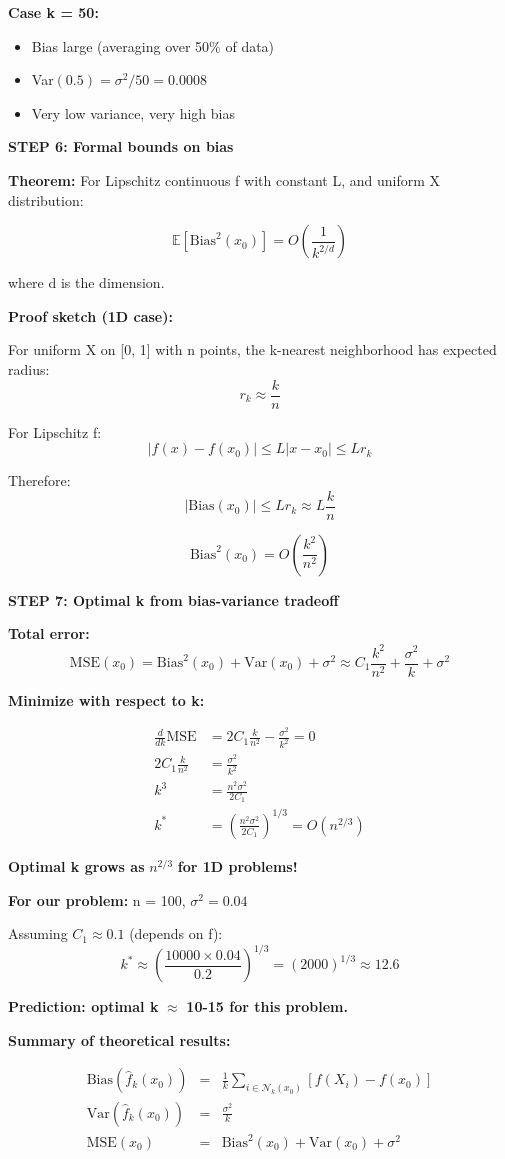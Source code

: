 \documentclass[12pt]{article}
\begin{document}
\begin{solution}
\textbf{Case k = 50:}
\begin{itemize}
    \item Bias large (averaging over 50\% of data)
    \item Var$(0.5) = \sigma^2/50 = 0.0008$
    \item Very low variance, very high bias
\end{itemize}

\textbf{STEP 6: Formal bounds on bias}

\textbf{Theorem:} For Lipschitz continuous f with constant L, and uniform X distribution:

\[
\mathbb{E}[\text{Bias}^2(x_0)] = O\left(\frac{1}{k^{2/d}}\right)
\]

where d is the dimension.

\textbf{Proof sketch (1D case):}

For uniform X on [0, 1] with n points, the k-nearest neighborhood has expected radius:
\[
r_k \approx \frac{k}{n}
\]

For Lipschitz f:
\[
|f(x) - f(x_0)| \leq L|x - x_0| \leq Lr_k
\]

Therefore:
\[
|\text{Bias}(x_0)| \leq Lr_k \approx L\frac{k}{n}
\]

\[
\text{Bias}^2(x_0) = O\left(\frac{k^2}{n^2}\right)
\]

\textbf{STEP 7: Optimal k from bias-variance tradeoff}

\textbf{Total error:}
\[
\text{MSE}(x_0) = \text{Bias}^2(x_0) + \text{Var}(x_0) + \sigma^2 \approx C_1\frac{k^2}{n^2} + \frac{\sigma^2}{k} + \sigma^2
\]

\textbf{Minimize with respect to k:}

\begin{align*}
\frac{d}{dk}\text{MSE} &= 2C_1\frac{k}{n^2} - \frac{\sigma^2}{k^2} = 0 \\
2C_1\frac{k}{n^2} &= \frac{\sigma^2}{k^2} \\
k^3 &= \frac{n^2\sigma^2}{2C_1} \\
k^* &= \left(\frac{n^2\sigma^2}{2C_1}\right)^{1/3} = O(n^{2/3})
\end{align*}

\textbf{Optimal k grows as } $n^{2/3}$ \textbf{ for 1D problems!}

\textbf{For our problem:} n = 100, $\sigma^2 = 0.04$

Assuming $C_1 \approx 0.1$ (depends on f):
\[
k^* \approx \left(\frac{10000 \times 0.04}{0.2}\right)^{1/3} = (2000)^{1/3} \approx 12.6
\]

\textbf{Prediction: optimal k } $\approx$ \textbf{ 10-15 for this problem.}

\textbf{Summary of theoretical results:}

\[
\boxed{
\begin{array}{rcl}
\text{Bias}(\hat{f}_k(x_0)) &=& \displaystyle\frac{1}{k}\sum_{i \in \mathcal{N}_k(x_0)} [f(X_i) - f(x_0)] \\[10pt]
\text{Var}(\hat{f}_k(x_0)) &=& \displaystyle\frac{\sigma^2}{k} \\[10pt]
\text{MSE}(x_0) &=& \text{Bias}^2(x_0) + \text{Var}(x_0) + \sigma^2
\end{array}
}
\]
\end{solution}
\end{document}
